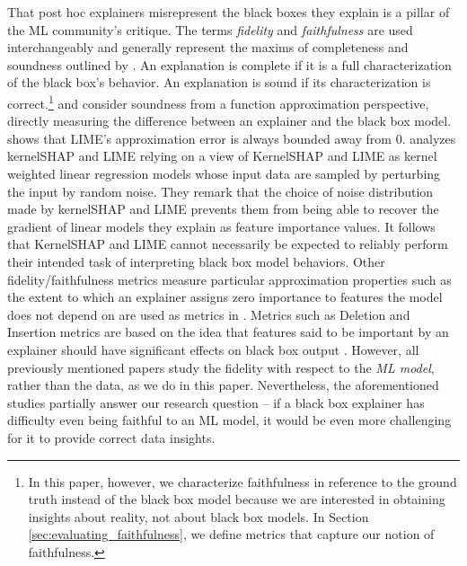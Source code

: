\documentclass[12pt]{article}  %
\begin{document}
    
        That post hoc explainers misrepresent the black boxes they explain is a pillar of the ML community's critique. The terms \emph{fidelity} and \emph{faithfulness} are used interchangeably and generally represent the maxims of completeness and soundness outlined by \cite{zhou21evaluating}. An explanation is complete if it is a full characterization of the black box's behavior. An explanation is sound if its characterization is correct.\footnote{In this paper, however, we characterize faithfulness in reference to the ground truth instead of the black box model because we are interested in obtaining insights about reality, not about black box models. In Section \ref{sec:evaluating_faithfulness}, we define metrics that capture our notion of faithfulness.} 
    \cite{garreau2020looking} and \cite{han22which} consider soundness from a function approximation perspective, directly measuring the difference between an explainer  and the black box model. \cite{garreau2020looking} shows that LIME's approximation error is always bounded away from 0. \cite{han22which} analyzes kernelSHAP and LIME relying on a view of KernelSHAP and LIME as kernel weighted linear regression models whose input data are sampled by perturbing the input by random noise. They remark that the choice of noise distribution made by kernelSHAP and LIME prevents them from being able to recover the gradient of linear models they explain as feature importance values. It follows that KernelSHAP and LIME cannot necessarily be expected to reliably perform their intended task of interpreting black box model behaviors. 
Other fidelity/faithfulness metrics measure particular approximation properties such as the extent to which an explainer assigns zero importance to features the model does not depend on are used as metrics in \cite{nguyen2020quantitative}. Metrics such as Deletion and Insertion metrics are based on the idea that features said to be important by an explainer should have significant effects on black box output \citep{deyoung20eraser,nguyen2020quantitative,alvarez18robustness,luss2021leveraging}. However, all previously mentioned papers study the fidelity with respect to the \textit{ML model}, rather than the data, as we do in this paper. Nevertheless, the aforementioned studies partially answer our research question -- if a black box explainer has difficulty even being faithful to an ML model, it would be even more challenging for it to provide correct data insights.
    
\end{document}
